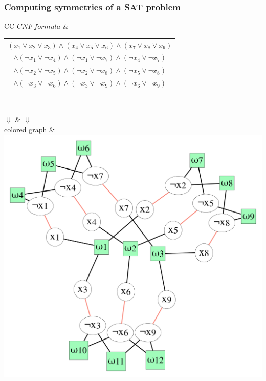 \documentclass{beamer}
\begin{document}
\begin{frame}
	\frametitle{Computing symmetries of a SAT problem}
	
	\begin{tabular}{CC}
		$CNF\ formula$ &{\scriptsize
			\begin{tabular}{c}
				$(x_1 \lor x_2 \lor x_3) \land
				(x_4 \lor x_5 \lor x_6) \land
				(x_7 \lor x_8 \lor x_9) $\\
				$\land (\neg x_1 \lor \neg x_4) \land
				(\neg x_1 \lor \neg x_7) \land
				(\neg x_4 \lor \neg x_7)$\\
				$\land (\neg x_2 \lor \neg x_5) \land
				(\neg x_2 \lor \neg x_8) \land
				(\neg x_5 \lor \neg x_8)$ \\
				$\land (\neg x_3 \lor \neg x_6) \land
				(\neg x_3 \lor \neg x_9) \land
				(\neg x_6 \lor \neg x_9)$\\
		\end{tabular}}\\
		\only<2> {
			
			$\Downarrow$ & $\Downarrow$  \\
			
			colored graph & 
			\includegraphics[scale=0.1]{images/graph}\\ \\
		}
		

\end{tabular}
\end{frame}
\end{document}
